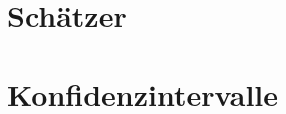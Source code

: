 \documentclass[a4paper,10pt]{article}
\begin{document}
\subsection{}

\subsection{}

\subsection{}

\newpage
\section{Schätzer}
\subsection{}

\subsection{}

\subsection{}

\newpage
\section{Konfidenzintervalle}
\subsection{}

\subsection{}

\subsection{}
\end{document}
